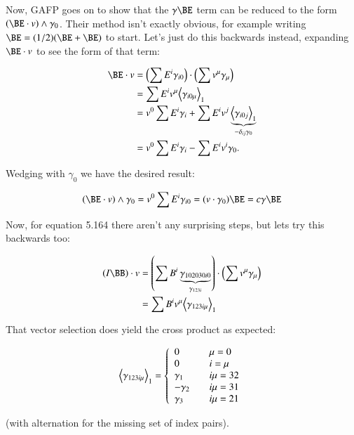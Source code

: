 Now, GAFP goes on to show that the $\gamma \BE$ term can be reduced to the form $(\BE \cdot v) \wedge \gamma_0$.  Their
method isn't exactly obvious, for example writing $\BE = (1/2)(\BE + \BE)$ to start.  Let's just do this backwards
instead, expanding $\BE \cdot v$ to see the form of that term:

\begin{align*}
\BE \cdot v
&= \left(\sum E^i \gamma_{i0}\right) \cdot \left( \sum v^{\mu} \gamma_{\mu}\right) \\
&= \sum E^i v^{\mu} \gpgradeone{ \gamma_{i0\mu}} \\
&= v^0 \sum E^i \gamma_{i} + \sum E^i v^{j} \underbrace{\gpgradeone{ \gamma_{i0j}}}_{-\delta_{ij} \gamma_0} \\
&= v^0 \sum E^i \gamma_i - \sum E^i v^i \gamma_0.
\end{align*}

Wedging with $\gamma_0$ we have the desired result:

\begin{equation*}
(\BE \cdot v) \wedge \gamma_0 = v^0 \sum E^i \gamma_{i0} = (v \cdot \gamma_0) \BE = c \gamma \BE
\end{equation*}

Now, for equation 5.164 there aren't any surprising steps, but lets try this backwards too:

\begin{align*}
(I \BB) \cdot v
&= \left(\sum B^i \underbrace{\gamma_{102030i0}}_{\gamma_{123i}} \right) \cdot \left( \sum v^{\mu} \gamma_{\mu} \right) \\
&= \sum B^i v^{\mu} \gpgradeone{\gamma_{123i\mu}}
\end{align*}

That vector selection does yield the cross product as expected:

\begin{equation*}
{\left\langle{{\gamma_{123i\mu}}}\right\rangle}_{1} =
\left\{
\begin{array}{l l}
0 & \quad \mu = 0 \\
0 & \quad i = \mu \\
\gamma_1 & \quad i\mu = 32 \\
-\gamma_2 & \quad i\mu = 31 \\
\gamma_3 & \quad i\mu = 21 \\
\end{array} \right.
\end{equation*}

(with alternation for the missing set of index pairs).

